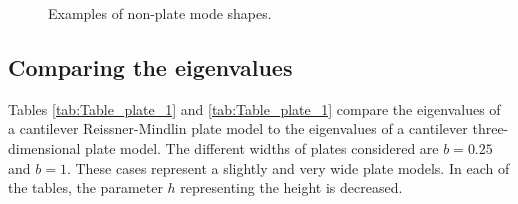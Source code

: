 \documentclass[../../main.tex]{subfiles}
\begin{document}
\begin{figure}[h!]
	\caption{Examples of non-plate mode shapes.}
\end{figure}

\subsection{Comparing the eigenvalues}
Tables \ref{tab:Table_plate_1} and \ref{tab:Table_plate_1} compare the eigenvalues of a cantilever Reissner-Mindlin plate model to the eigenvalues of a cantilever three-dimensional plate model. The different widths of plates considered are $b = 0.25$ and $b = 1$. These cases represent a slightly and very wide plate models. In each of the tables, the parameter $h$ representing the height is decreased.
\end{document}
